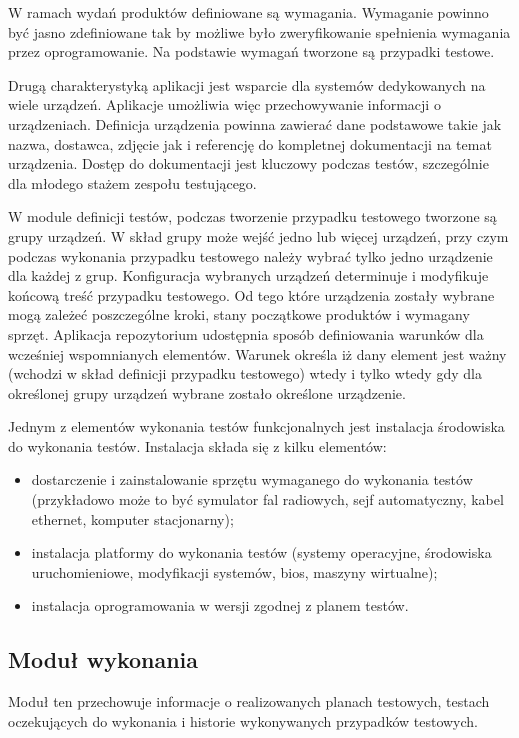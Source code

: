 W ramach wydań produktów definiowane są wymagania. Wymaganie powinno być jasno zdefiniowane tak by możliwe było zweryfikowanie spełnienia wymagania przez oprogramowanie. Na podstawie wymagań tworzone są przypadki testowe.

Drugą charakterystyką aplikacji jest wsparcie dla systemów dedykowanych na wiele urządzeń. Aplikacje umożliwia więc przechowywanie informacji o urządzeniach. Definicja urządzenia powinna zawierać dane podstawowe takie jak nazwa, dostawca, zdjęcie jak i referencję do kompletnej dokumentacji na temat urządzenia. Dostęp do dokumentacji jest kluczowy podczas testów, szczególnie dla młodego stażem zespołu testującego.

W module definicji testów, podczas tworzenie przypadku testowego tworzone są grupy urządzeń. W skład grupy może wejść jedno lub więcej urządzeń, przy czym podczas wykonania przypadku testowego należy wybrać tylko jedno urządzenie dla każdej z grup. Konfiguracja wybranych urządzeń determinuje i modyfikuje końcową treść przypadku testowego. Od tego które urządzenia zostały wybrane mogą zależeć poszczególne kroki, stany początkowe produktów i wymagany sprzęt. Aplikacja repozytorium udostępnia sposób definiowania warunków dla wcześniej wspomnianych elementów. Warunek określa iż dany element jest ważny (wchodzi w skład definicji przypadku testowego) wtedy i tylko wtedy gdy dla określonej grupy urządzeń wybrane zostało określone urządzenie.

Jednym z elementów wykonania testów funkcjonalnych jest instalacja środowiska do wykonania testów. Instalacja składa się z kilku elementów:
\begin{itemize}
  \item dostarczenie i zainstalowanie sprzętu wymaganego do wykonania testów (przykładowo może to być symulator fal radiowych, sejf automatyczny, kabel ethernet, komputer stacjonarny);
  \item instalacja platformy do wykonania testów (systemy operacyjne, środowiska uruchomieniowe, modyfikacji systemów, bios, maszyny wirtualne);
  \item instalacja oprogramowania w wersji zgodnej z planem testów.
\end{itemize}

\subsection{Moduł wykonania }

Moduł ten przechowuje informacje o realizowanych planach testowych, testach oczekujących do wykonania i historie wykonywanych przypadków testowych.

